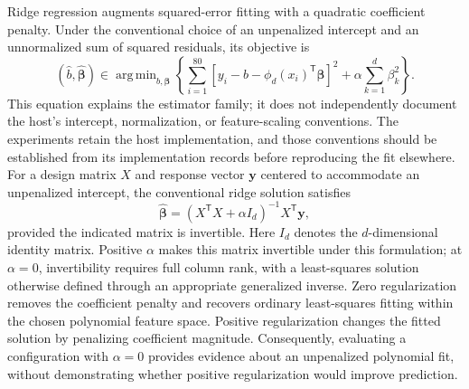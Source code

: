 \documentclass[11pt]{article}
\begin{document}
Ridge regression augments squared-error fitting with a quadratic coefficient penalty. Under the conventional choice of an unpenalized intercept and an unnormalized sum of squared residuals, its objective is
\[
(\widehat b,\widehat{\boldsymbol{\beta}})
\in
\mathop{\mathrm{arg\,min}}_{b,\boldsymbol{\beta}}
\left\{
\sum_{i=1}^{80}
\left[y_i-b-\phi_d(x_i)^{\mathsf T}\boldsymbol{\beta}\right]^2
+
\alpha\sum_{k=1}^{d}\beta_k^2
\right\}.
\]
This equation explains the estimator family; it does not independently document the host's intercept, normalization, or feature-scaling conventions. The experiments retain the host implementation, and those conventions should be established from its implementation records before reproducing the fit elsewhere. For a design matrix \(X\) and response vector \(\boldsymbol y\) centered to accommodate an unpenalized intercept, the conventional ridge solution satisfies
\[
\widehat{\boldsymbol{\beta}}
=
(X^{\mathsf T}X+\alpha I_d)^{-1}X^{\mathsf T}\boldsymbol y,
\]
provided the indicated matrix is invertible. Here \(I_d\) denotes the \(d\)-dimensional identity matrix. Positive \(\alpha\) makes this matrix invertible under this formulation; at \(\alpha=0\), invertibility requires full column rank, with a least-squares solution otherwise defined through an appropriate generalized inverse. Zero regularization removes the coefficient penalty and recovers ordinary least-squares fitting within the chosen polynomial feature space. Positive regularization changes the fitted solution by penalizing coefficient magnitude. Consequently, evaluating a configuration with \(\alpha=0\) provides evidence about an unpenalized polynomial fit, without demonstrating whether positive regularization would improve prediction.
\end{document}
